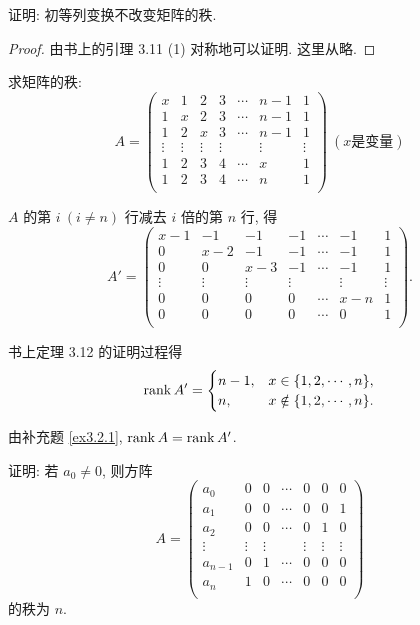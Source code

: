 \documentclass{ctexart}
\begin{document}
\begin{exercisec}[3.2.1(1)]\label{ex3.2.1}
    证明: 初等列变换不改变矩阵的秩.
\end{exercisec}
\begin{proof}
    由书上的引理 3.11 (1) 对称地可以证明. 这里从略.
\end{proof}
\begin{exercisec}[3.2.2(5)]
    求矩阵的秩:
    \[A=\begin{pmatrix}
        x & 1 & 2 & 3 & \cdots & n-1 & 1 \\
        1 & x & 2 & 3 & \cdots & n-1 & 1 \\
        1 & 2 & x & 3 & \cdots & n-1 & 1 \\
        \vdots & \vdots & \vdots & \vdots && \vdots & \vdots \\
        1 & 2 & 3 & 4 & \cdots & x & 1 \\
        1 & 2 & 3 & 4 & \cdots & n & 1 \\
    \end{pmatrix}\ (x \text{是变量})\]
\end{exercisec}
\begin{solution}
    $A$ 的第 $i\ (i\neq n)$ 行减去 $i$ 倍的第 $n$ 行, 得
    \[A'=\begin{pmatrix}
        x-1 & -1 & -1 & -1 & \cdots & -1 & 1 \\
        0 & x-2 & -1 & -1 & \cdots & -1 & 1 \\
        0 & 0 & x-3 & -1 & \cdots & -1 & 1 \\
        \vdots & \vdots & \vdots & \vdots && \vdots & \vdots \\
        0 & 0 & 0 & 0 & \cdots & x-n & 1 \\
        0 & 0 & 0 & 0 & \cdots & 0 & 1 \\
    \end{pmatrix}.\]

    书上定理 3.12 的证明过程得
    \[\operatorname{rank} A'=\begin{cases}
        n-1, & x\in\{1,2,\cdots,n\}, \\
        n, & x\notin\{1,2,\cdots,n\}. \\
    \end{cases}\]

    由补充题 \ref{ex3.2.1}, $\operatorname{rank} A=\operatorname{rank} A'$.
\end{solution}
\begin{exercisec}[3.2.3]
    证明: 若 $a_0\neq0$, 则方阵
    \[A=\begin{pmatrix}
        a_0 & 0 & 0 & \cdots & 0 & 0 & 0 \\
        a_1 & 0 & 0 & \cdots & 0 & 0 & 1 \\
        a_2 & 0 & 0 & \cdots & 0 & 1 & 0 \\
        \vdots & \vdots & \vdots && \vdots & \vdots & \vdots \\
        a_{n-1} & 0 & 1 & \cdots & 0 & 0 & 0 \\
        a_n & 1 & 0 & \cdots & 0 & 0 & 0 \\
    \end{pmatrix}\]
    的秩为 $n$.
\end{exercisec}
\end{document}
